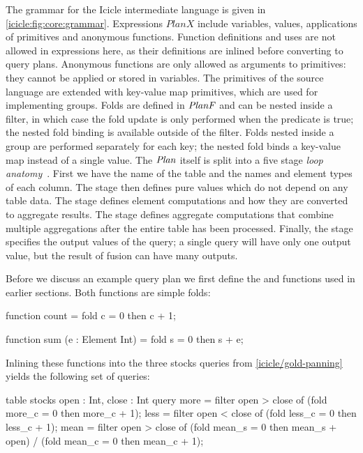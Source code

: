 The grammar for the Icicle intermediate language is given in \cref{icicle:fig:core:grammar}.
Expressions $PlanX$ include variables, values, applications of primitives and anonymous functions.
Function definitions and uses are not allowed in expressions here, as their definitions are inlined before converting to query plans.
Anonymous functions are only allowed as arguments to primitives: they cannot be applied or stored in variables.
The primitives of the source language are extended with key-value map primitives, which are used for implementing groups.
Folds are defined in $\mathit{PlanF}$ and can be nested inside a filter, in which case the fold update is only performed when the predicate is true; the nested fold binding is available outside of the filter.
Folds nested inside a group are performed separately for each key; the nested fold binds a key-value map instead of a single value.
The $\mathit{Plan}$ itself is split into a five stage \emph{loop anatomy}~\cite{shivers2005anatomy}.
First we have the name of the table and the names and element types of each column.
The \IcC@before@ stage then defines pure values which do not depend on any table data.
The \IcC@folds@ stage defines element computations and how they are converted to aggregate results.
The \IcC@after@ stage defines aggregate computations that combine multiple aggregations after the entire table has been processed.
Finally, the \IcC@return@ stage specifies the output values of the query; a single query will have only one output value, but the result of fusion can have many outputs.


Before we discuss an example query plan we first define the \IcC@count@ and \IcC@sum@ functions used in earlier sections.
Both functions are simple folds:
\begin{icicle}
function count
 = fold c = 0 then c + 1;

function sum (e : Element Int)
 = fold s = 0 then s + e;
\end{icicle}

Inlining these functions into the three stocks queries from \cref{icicle/gold-panning} yields the following set of queries:

\begin{icicle}
table stocks { open : Int, close : Int }
query 
  more = filter open > close of (fold more_c = 0 then more_c + 1);
  less = filter open < close of (fold less_c = 0 then less_c + 1);
  mean = filter open > close of
      (fold mean_s = 0 then mean_s + open) / (fold mean_c = 0 then mean_c + 1);
\end{icicle}

